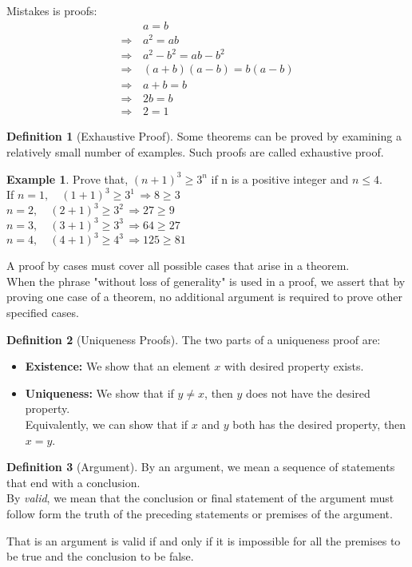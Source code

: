 \documentclass[12pt,oneside,a4paper]{book}
\theoremstyle{remark}
\theoremstyle{definition}
\newtheorem{defn}{Definition}
\newtheorem*{ex}{Example}
\begin{document}
Mistakes is proofs:
\begin{align*}
                & \,a = b              \\
    \Rightarrow & \,a^2 =ab            \\
    \Rightarrow & \,a^2-b^2=ab-b^2     \\
    \Rightarrow & \,(a+b)(a-b)= b(a-b) \\
    \Rightarrow & \,a+b=b              \\
    \Rightarrow & \,2b=b               \\
    \Rightarrow & \,2=1
\end{align*}
\begin{defn}[Exhaustive Proof]
    Some theorems can be proved by examining a relatively small number of examples. Such proofs are called exhaustive proof.
\end{defn}
\begin{ex}
    Prove that, \((n+1)^3\geq3^n\) if n is a positive integer and \(n\leq4\).\\
    If \(n=1,\quad(1+1)^3\geq3^1\,\Rightarrow8\geq3\)\\
    \(n=2,\quad(2+1)^3\geq3^2\,\Rightarrow27\geq9\)\\
    \(n=3,\quad(3+1)^3\geq3^3\,\Rightarrow64\geq27\)\\
    \(n=4,\quad(4+1)^3\geq4^3\,\Rightarrow125\geq81\)\\
\end{ex}
A proof by cases must cover all possible cases that arise in a theorem.\\
When the phrase "without loss of generality" is used in a proof, we assert that by proving one case of a theorem, no additional argument is required to prove other specified cases.
\begin{defn}[Uniqueness Proofs]
    The two parts of a uniqueness proof are:
    \begin{itemize}
        \item \textbf{Existence:} We show that an element $ x $ with desired property exists.
        \item \textbf{Uniqueness:} We show that if \(y\neq x\), then $ y $ does not have the desired property.\\
              Equivalently, we can show that if $ x $ and $ y $ both has the desired property, then \(x=y\).
    \end{itemize}
\end{defn}
\begin{defn}[Argument]
    By an argument, we mean a sequence of statements that end with a conclusion.\\
    By \emph{valid}, we mean that the conclusion or final statement of the argument must follow form the truth of the preceding statements or premises of the argument.

    That is an argument is valid if and only if it is impossible for all the premises to be true and the conclusion to be false.
\end{defn}
\end{document}
